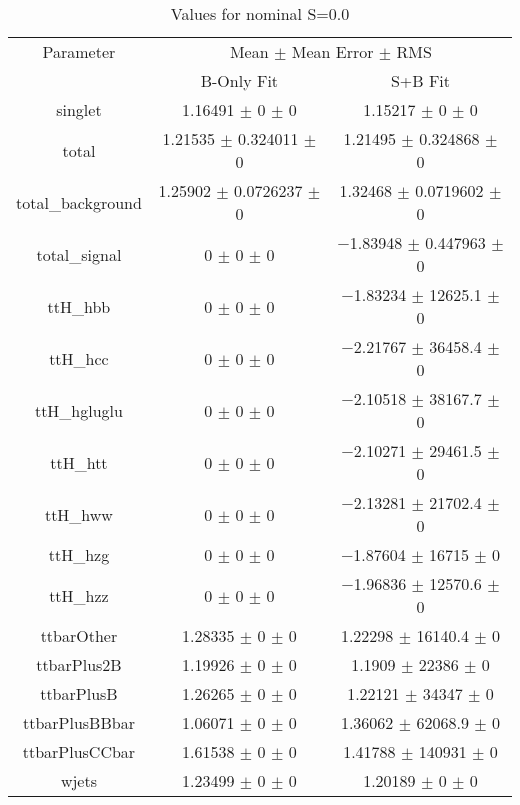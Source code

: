 \begin{table}
\centering
\caption{Values for nominal S=0.0}
\begin{tabular}{ccc}
\toprule
Parameter & \multicolumn{2}{c}{Mean $\pm$ Mean Error $\pm$ RMS}\\
 & B-Only Fit & S+B Fit\\
\midrule
singlet & \num{1.16491} $\pm$ \num{0} $\pm$ \num{0} & \num{1.15217} $\pm$ \num{0} $\pm$ \num{0}\\
total & \num{1.21535} $\pm$ \num{0.324011} $\pm$ \num{0} & \num{1.21495} $\pm$ \num{0.324868} $\pm$ \num{0}\\
total\_background & \num{1.25902} $\pm$ \num{0.0726237} $\pm$ \num{0} & \num{1.32468} $\pm$ \num{0.0719602} $\pm$ \num{0}\\
total\_signal & \num{0} $\pm$ \num{0} $\pm$ \num{0} & \num{-1.83948} $\pm$ \num{0.447963} $\pm$ \num{0}\\
ttH\_hbb & \num{0} $\pm$ \num{0} $\pm$ \num{0} & \num{-1.83234} $\pm$ \num{12625.1} $\pm$ \num{0}\\
ttH\_hcc & \num{0} $\pm$ \num{0} $\pm$ \num{0} & \num{-2.21767} $\pm$ \num{36458.4} $\pm$ \num{0}\\
ttH\_hgluglu & \num{0} $\pm$ \num{0} $\pm$ \num{0} & \num{-2.10518} $\pm$ \num{38167.7} $\pm$ \num{0}\\
ttH\_htt & \num{0} $\pm$ \num{0} $\pm$ \num{0} & \num{-2.10271} $\pm$ \num{29461.5} $\pm$ \num{0}\\
ttH\_hww & \num{0} $\pm$ \num{0} $\pm$ \num{0} & \num{-2.13281} $\pm$ \num{21702.4} $\pm$ \num{0}\\
ttH\_hzg & \num{0} $\pm$ \num{0} $\pm$ \num{0} & \num{-1.87604} $\pm$ \num{16715} $\pm$ \num{0}\\
ttH\_hzz & \num{0} $\pm$ \num{0} $\pm$ \num{0} & \num{-1.96836} $\pm$ \num{12570.6} $\pm$ \num{0}\\
ttbarOther & \num{1.28335} $\pm$ \num{0} $\pm$ \num{0} & \num{1.22298} $\pm$ \num{16140.4} $\pm$ \num{0}\\
ttbarPlus2B & \num{1.19926} $\pm$ \num{0} $\pm$ \num{0} & \num{1.1909} $\pm$ \num{22386} $\pm$ \num{0}\\
ttbarPlusB & \num{1.26265} $\pm$ \num{0} $\pm$ \num{0} & \num{1.22121} $\pm$ \num{34347} $\pm$ \num{0}\\
ttbarPlusBBbar & \num{1.06071} $\pm$ \num{0} $\pm$ \num{0} & \num{1.36062} $\pm$ \num{62068.9} $\pm$ \num{0}\\
ttbarPlusCCbar & \num{1.61538} $\pm$ \num{0} $\pm$ \num{0} & \num{1.41788} $\pm$ \num{140931} $\pm$ \num{0}\\
wjets & \num{1.23499} $\pm$ \num{0} $\pm$ \num{0} & \num{1.20189} $\pm$ \num{0} $\pm$ \num{0}\\
\bottomrule
\end{tabular}
\end{table}